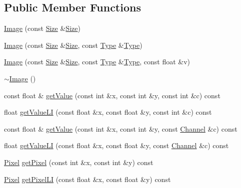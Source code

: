 \begin{CompactItemize}
\subsection*{Public Member Functions}
\begin{CompactItemize}
\item 
\hyperlink{class_hydrax_1_1_image_631e057134038b76a40a9cf3692d4fec}{Image} (const \hyperlink{struct_hydrax_1_1_size}{Size} \&\hyperlink{struct_hydrax_1_1_size}{Size})
\item 
\hyperlink{class_hydrax_1_1_image_964018639ef80bf7274ec3eb564bc5e1}{Image} (const \hyperlink{struct_hydrax_1_1_size}{Size} \&\hyperlink{struct_hydrax_1_1_size}{Size}, const \hyperlink{class_hydrax_1_1_image_1dab7f4b50bbbf4eb5a5b55c46defced}{Type} \&\hyperlink{class_hydrax_1_1_image_1dab7f4b50bbbf4eb5a5b55c46defced}{Type})
\item 
\hyperlink{class_hydrax_1_1_image_3ebb813438f174afb0a2034df4103ced}{Image} (const \hyperlink{struct_hydrax_1_1_size}{Size} \&\hyperlink{struct_hydrax_1_1_size}{Size}, const \hyperlink{class_hydrax_1_1_image_1dab7f4b50bbbf4eb5a5b55c46defced}{Type} \&\hyperlink{class_hydrax_1_1_image_1dab7f4b50bbbf4eb5a5b55c46defced}{Type}, const float \&v)
\item 
\hyperlink{class_hydrax_1_1_image_326c283842e93944fabea025b26a50f7}{$\sim$Image} ()
\item 
const float \& \hyperlink{class_hydrax_1_1_image_3e05904d8904baf193e6687c938d1d5b}{getValue} (const int \&x, const int \&y, const int \&c) const 
\item 
float \hyperlink{class_hydrax_1_1_image_ac15faab325f8dc9df4961e78228a6f8}{getValueLI} (const float \&x, const float \&y, const int \&c) const 
\item 
const float \& \hyperlink{class_hydrax_1_1_image_1a021dc1afd9074172f512ecc2fe4d2e}{getValue} (const int \&x, const int \&y, const \hyperlink{class_hydrax_1_1_image_89b5fe40f19103fd27240511665344df}{Channel} \&c) const 
\item 
float \hyperlink{class_hydrax_1_1_image_75d101bcf467cee66dbafc8c28479c2b}{getValueLI} (const float \&x, const float \&y, const \hyperlink{class_hydrax_1_1_image_89b5fe40f19103fd27240511665344df}{Channel} \&c) const 
\item 
\hyperlink{struct_hydrax_1_1_image_1_1_pixel}{Pixel} \hyperlink{class_hydrax_1_1_image_866bdef55697fe70add44705d5e076ab}{getPixel} (const int \&x, const int \&y) const 
\item 
\hyperlink{struct_hydrax_1_1_image_1_1_pixel}{Pixel} \hyperlink{class_hydrax_1_1_image_433e71c1e9630bbaddbcef5795f50bfa}{getPixelLI} (const float \&x, const float \&y) const 

\end{CompactItemize}
\end{CompactItemize}
